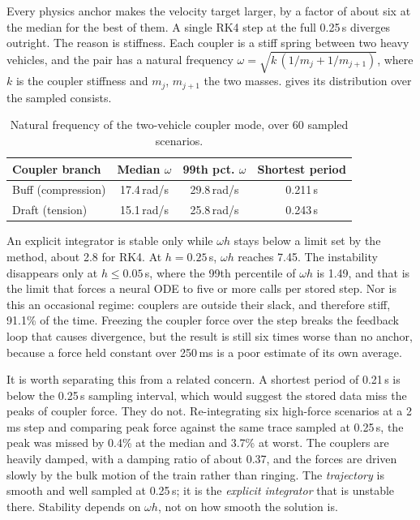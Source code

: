 Every physics anchor makes the velocity target larger, by a factor of about six at the median for the best of them. A single RK4 step at the full 0.25\,s diverges outright. The reason is stiffness. Each coupler is a stiff spring between two heavy vehicles, and the pair has a natural frequency $\omega = \sqrt{k\,(1/m_j + 1/m_{j+1})}$, where $k$ is the coupler stiffness and $m_j$, $m_{j+1}$ the two masses.  gives its distribution over the sampled consists.

\begin{table}[htbp]
    \centering
    \begin{tabular}{lccc}
        \toprule
        Coupler branch & Median $\omega$ & 99th pct. $\omega$ & Shortest period \\
        \midrule
        Buff (compression) & 17.4\,rad/s & 29.8\,rad/s & 0.211\,s \\
        Draft (tension)    & 15.1\,rad/s & 25.8\,rad/s & 0.243\,s \\
        \bottomrule
    \end{tabular}
    \caption{Natural frequency of the two-vehicle coupler mode, over 60 sampled scenarios.}
    \label{tab:arch_stiffness}
\end{table}

An explicit integrator is stable only while $\omega h$ stays below a limit set by the method, about 2.8 for RK4. At $h = 0.25$\,s, $\omega h$ reaches 7.45. The instability disappears only at $h \le 0.05$\,s, where the 99th percentile of $\omega h$ is 1.49, and that is the limit that forces a neural ODE to five or more calls per stored step. Nor is this an occasional regime: couplers are outside their slack, and therefore stiff, 91.1\% of the time. Freezing the coupler force over the step breaks the feedback loop that causes divergence, but the result is still six times worse than no anchor, because a force held constant over 250\,ms is a poor estimate of its own average.

It is worth separating this from a related concern. A shortest period of 0.21\,s is below the 0.25\,s sampling interval, which would suggest the stored data miss the peaks of coupler force. They do not. Re-integrating six high-force scenarios at a 2\,ms step and comparing peak force against the same trace sampled at 0.25\,s, the peak was missed by 0.4\% at the median and 3.7\% at worst. The couplers are heavily damped, with a damping ratio of about 0.37, and the forces are driven slowly by the bulk motion of the train rather than ringing. The \emph{trajectory} is smooth and well sampled at 0.25\,s; it is the \emph{explicit integrator} that is unstable there. Stability depends on $\omega h$, not on how smooth the solution is.

